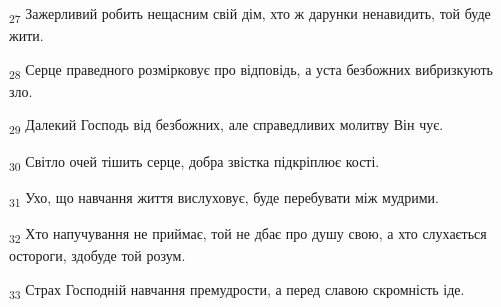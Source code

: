 \begin{tcolorbox}
\textsubscript{27} Зажерливий робить нещасним свій дім, хто ж дарунки ненавидить, той буде жити.
\end{tcolorbox}
\begin{tcolorbox}
\textsubscript{28} Серце праведного розмірковує про відповідь, а уста безбожних вибризкують зло.
\end{tcolorbox}
\begin{tcolorbox}
\textsubscript{29} Далекий Господь від безбожних, але справедливих молитву Він чує.
\end{tcolorbox}
\begin{tcolorbox}
\textsubscript{30} Світло очей тішить серце, добра звістка підкріплює кості.
\end{tcolorbox}
\begin{tcolorbox}
\textsubscript{31} Ухо, що навчання життя вислуховує, буде перебувати між мудрими.
\end{tcolorbox}
\begin{tcolorbox}
\textsubscript{32} Хто напучування не приймає, той не дбає про душу свою, а хто слухається остороги, здобуде той розум.
\end{tcolorbox}
\begin{tcolorbox}
\textsubscript{33} Страх Господній навчання премудрости, а перед славою скромність іде.
\end{tcolorbox}
